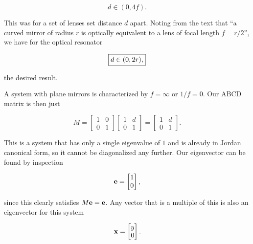 {\begin{dmath}\label{eqn:problemSet4Problem2:1120}
d \in (0, 4 f).
\end{dmath}

This was for a set of lenses set distance $d$ apart.  Noting from the text that ``a curved mirror of radius $r$ is optically equivalent to a lens of focal length $f = r/2$'', we have for the optical resonator

\begin{dmath}\label{eqn:problemSet4Problem2:1140}
\myBoxed{
d \in (0, 2 r),
}
\end{dmath}

the desired result.


A system with plane mirrors is characterized by $f = \infty$ or $1/f = 0$.  Our ABCD matrix is then just

\begin{equation}\label{eqn:problemSet4Problem2:1160}
M =
\begin{bmatrix}
1 & 0 \\
0 & 1
\end{bmatrix}
\begin{bmatrix}
1 & d \\
0 & 1
\end{bmatrix}
=
\begin{bmatrix}
1 & d \\
0 & 1
\end{bmatrix}.
\end{equation}

This is a system that has only a single eigenvalue of $1$ and is already in Jordan canonical form, so it cannot be diagonalized any further.  Our eigenvector can be found by inspection

\begin{dmath}\label{eqn:problemSet4Problem2:640}
\Be =
\begin{bmatrix}
1 \\
0
\end{bmatrix},
\end{dmath}

since this clearly satisfies $M \mathbf{e} = \mathbf{e}$.  Any vector that is a multiple of this is also an eigenvector for this system

\begin{dmath}\label{eqn:problemSet4Problem2:660}
\Bx =
\begin{bmatrix}
y \\
0
\end{bmatrix}.
\end{dmath}

}
